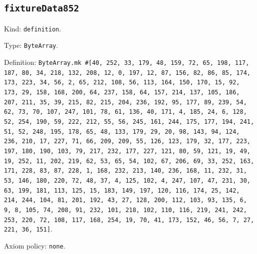 \documentclass[11pt]{article}
\begin{document}
\subsection*{\texttt{fixtureData852}}
\noindent Kind: \texttt{definition}.\par
\noindent Type: \texttt{ByteArray}.\par
\noindent Definition: \texttt{ByteArray.mk \#[40, 252, 33, 179, 48, 159, 72, 65, 198, 117, 187, 80, 34, 218, 132, 208, 12, 0, 197, 12, 87, 156, 82, 86, 85, 174, 173, 223, 34, 56, 2, 65, 212, 108, 56, 113, 164, 150, 170, 15, 92, 173, 29, 158, 168, 200, 64, 237, 158, 64, 157, 214, 137, 105, 186, 207, 211, 35, 39, 215, 82, 215, 204, 236, 192, 95, 177, 89, 239, 54, 62, 73, 70, 107, 247, 101, 78, 61, 136, 40, 171, 4, 185, 24, 6, 128, 52, 254, 190, 59, 222, 212, 55, 56, 245, 161, 244, 175, 177, 194, 241, 51, 52, 248, 195, 178, 65, 48, 133, 179, 29, 20, 98, 143, 94, 124, 236, 210, 17, 227, 71, 66, 209, 209, 55, 126, 123, 179, 32, 177, 223, 197, 180, 190, 103, 79, 217, 232, 177, 227, 121, 80, 59, 121, 19, 49, 19, 252, 11, 202, 219, 62, 53, 65, 54, 102, 67, 206, 69, 33, 252, 163, 171, 228, 83, 87, 228, 1, 168, 232, 213, 140, 236, 168, 11, 232, 31, 53, 146, 180, 220, 72, 48, 37, 4, 125, 102, 4, 247, 107, 47, 231, 30, 63, 199, 181, 113, 125, 15, 183, 149, 197, 120, 116, 174, 25, 142, 214, 244, 104, 81, 201, 192, 43, 27, 128, 200, 112, 103, 93, 135, 6, 9, 8, 105, 74, 208, 91, 232, 101, 218, 102, 110, 116, 219, 241, 242, 253, 220, 72, 108, 117, 168, 254, 19, 70, 41, 173, 152, 46, 56, 7, 27, 221, 36, 151]}.\par
\noindent Axiom policy: \texttt{none}.\par
\end{document}
